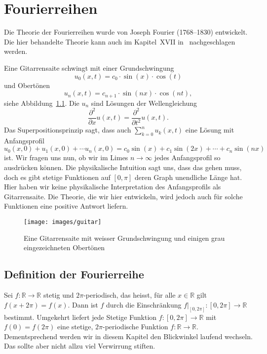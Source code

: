 \documentclass[../main.tex]{subfiles}
\begin{document}
\chapter{Fourierreihen}
Die Theorie der Fourierreihen wurde von Joseph Fourier
(1768--1830) entwickelt.
Die hier behandelte Theorie kann auch im Kapitel~XVII
in~\cite{heuser} nachgeschlagen werden.


\begin{motivation}
  Eine Gitarrensaite schwingt mit einer Grundschwingung
  \[
    u_0(x, t) = c_0 \cdot \sin(x) \cdot \cos(t)
  \]
  und Obertönen
  \[
    u_n(x, t) = c_{n+1} \cdot \sin(nx) \cdot \cos(nt),
  \]
  siehe Abbildung~\ref{fig:guitar}.
  Die $u_n$ sind Lösungen der Wellengleichung
  \[
    \frac{\partial^2}{\partial x} u(x, t)
    =
    \frac{\partial^2}{\partial t^2} u(x, t).
  \]
  Das Superpositionsprinzip sagt, dass auch
  $\sum_{k=0}^{n} u_k(x, t)$ eine Lösung
  mit Anfangsprofil 
  \[
    u_0(x, 0) + u_1(x, 0) + \cdots u_n(x, 0)
    = c_0 \sin(x) + c_1 \sin(2x) + \cdots + c_n \sin(nx)
  \]
  ist.
  Wir fragen uns nun, ob wir im Limes $n \to \infty$ 
  jedes Anfangsprofil so ausdrücken können.
  Die physikalische Intuition sagt uns, dass das gehen muss,
  doch es gibt stetige Funktionen auf $[0, \pi]$
  deren Graph unendliche Länge
  hat.
  Hier haben wir keine physikalische Interpretation des
  Anfangsprofils als Gitarrensaite. Die Theorie, die wir hier
  entwickeln, wird jedoch auch für solche Funktionen
  eine positive Antwort liefern.

\begin{figure}[htb]
  \centering
  \texttt{[image: images/guitar]}
  \caption{Eine Gitarrensaite mit weisser Grundschwingung
  und einigen grau eingezeichneten Obertönen}%
  \label{fig:guitar}
\end{figure}
\end{motivation}

\section{Definition der Fourierreihe}

Sei $f \colon \mathbb{R} \to \mathbb{R}$ stetig
und $2 \pi $-periodisch, das heisst, für alle
$x \in \mathbb{R}$ gilt $f(x + 2 \pi ) = f(x)$.
Dann ist $f$ durch die Einschränkung
$f|_{[0, 2\pi]} \colon [0, 2\pi] \to \mathbb{R}$ bestimmt.
Umgekehrt liefert jede Stetige Funktion
$f \colon[0, 2\pi] \to \mathbb{R}$ mit $f(0) = f(2\pi)$
eine stetige, $2\pi$-periodische Funktion
$f \colon \mathbb{R} \to \mathbb{R}$.
Dementsprechend werden wir in diesem Kapitel
den Blickwinkel laufend wechseln. Das sollte aber nicht
allzu viel Verwirrung stiften.
\end{document}
